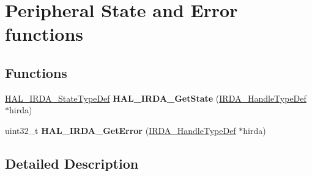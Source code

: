 \hypertarget{group___i_r_d_a___exported___functions___group3}{}\section{Peripheral State and Error functions}
\label{group___i_r_d_a___exported___functions___group3}
\subsection*{Functions}
\begin{DoxyCompactItemize}
\item 
\mbox{\label{group___i_r_d_a___exported___functions___group3_ga66ac92837c0eb309ae8c9513b83f5fe0}} 
\hyperlink{group___i_r_d_a___exported___types_gab3e65b75c9d4ae39bc50a31222509e1e}{H\+A\+L\+\_\+\+I\+R\+D\+A\+\_\+\+State\+Type\+Def} {\bfseries H\+A\+L\+\_\+\+I\+R\+D\+A\+\_\+\+Get\+State} (\hyperlink{struct_i_r_d_a___handle_type_def}{I\+R\+D\+A\+\_\+\+Handle\+Type\+Def} $\ast$hirda)
\item 
\mbox{\label{group___i_r_d_a___exported___functions___group3_ga5401e767569d4996aa48c0a81b645b44}} 
uint32\+\_\+t {\bfseries H\+A\+L\+\_\+\+I\+R\+D\+A\+\_\+\+Get\+Error} (\hyperlink{struct_i_r_d_a___handle_type_def}{I\+R\+D\+A\+\_\+\+Handle\+Type\+Def} $\ast$hirda)
\end{DoxyCompactItemize}


\subsection{Detailed Description}

